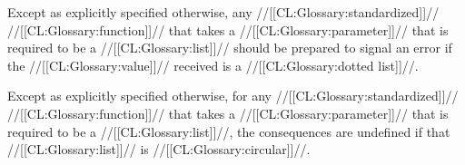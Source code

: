 \endsubsubsection%


Except as explicitly specified otherwise, any //[[CL:Glossary:standardized]]// //[[CL:Glossary:function]]// that takes a //[[CL:Glossary:parameter]]// that is required to be a //[[CL:Glossary:list]]// should be prepared to signal  an error  if the //[[CL:Glossary:value]]// received is a //[[CL:Glossary:dotted list]]//.

Except as explicitly specified otherwise, for any //[[CL:Glossary:standardized]]// //[[CL:Glossary:function]]// that takes a //[[CL:Glossary:parameter]]// that is required to be a //[[CL:Glossary:list]]//,  the consequences are undefined  if that //[[CL:Glossary:list]]// is //[[CL:Glossary:circular]]//.

\endsubsubsection%

\endsubsection%
